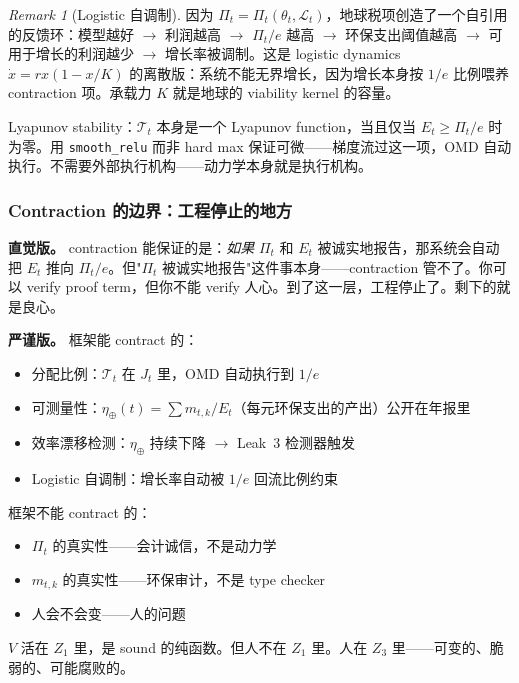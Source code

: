 \documentclass[11pt,a4paper]{article}
\theoremstyle{definition}
\theoremstyle{remark}
\newtheorem{remark}[theorem]{Remark}
\begin{document}
\begin{remark}[Logistic 自调制]
因为 $\Pi_t = \Pi_t(\theta_t, \mathcal{L}_t)$，地球税项创造了一个自引用的反馈环：模型越好 $\to$ 利润越高 $\to$ $\Pi_t / e$ 越高 $\to$ 环保支出阈值越高 $\to$ 可用于增长的利润越少 $\to$ 增长率被调制。这是 logistic dynamics $\dot{x} = rx(1 - x/K)$ 的离散版：系统不能无界增长，因为增长本身按 $1/e$ 比例喂养 contraction 项。承载力 $K$ 就是地球的 viability kernel 的容量。
\end{remark}

Lyapunov stability：$\mathcal{T}_t$ 本身是一个 Lyapunov function，当且仅当 $E_t \geq \Pi_t / e$ 时为零。用 \texttt{smooth\_relu} 而非 hard max 保证可微——梯度流过这一项，OMD 自动执行。不需要外部执行机构——动力学本身就是执行机构。


\subsubsection*{Contraction 的边界：工程停止的地方}

\textbf{直觉版。}
contraction 能保证的是：\emph{如果} $\Pi_t$ 和 $E_t$ 被诚实地报告，那系统会自动把 $E_t$ 推向 $\Pi_t / e$。但"$\Pi_t$ 被诚实地报告"这件事本身——contraction 管不了。你可以 verify proof term，但你不能 verify 人心。到了这一层，工程停止了。剩下的就是良心。

\textbf{严谨版。}
框架能 contract 的：
\begin{itemize}[nosep]
  \item 分配比例：$\mathcal{T}_t$ 在 $J_t$ 里，OMD 自动执行到 $1/e$
  \item 可测量性：$\eta_{\oplus}(t) = \sum m_{t,k} / E_t$（每元环保支出的产出）公开在年报里
  \item 效率漂移检测：$\eta_{\oplus}$ 持续下降 $\to$ Leak~3 检测器触发
  \item Logistic 自调制：增长率自动被 $1/e$ 回流比例约束
\end{itemize}

框架不能 contract 的：
\begin{itemize}[nosep]
  \item $\Pi_t$ 的真实性——会计诚信，不是动力学
  \item $m_{t,k}$ 的真实性——环保审计，不是 type checker
  \item 人会不会变——人的问题
\end{itemize}

$V$ 活在 $Z_1$ 里，是 sound 的纯函数。但人不在 $Z_1$ 里。人在 $Z_3$ 里——可变的、脆弱的、可能腐败的。
\end{document}
